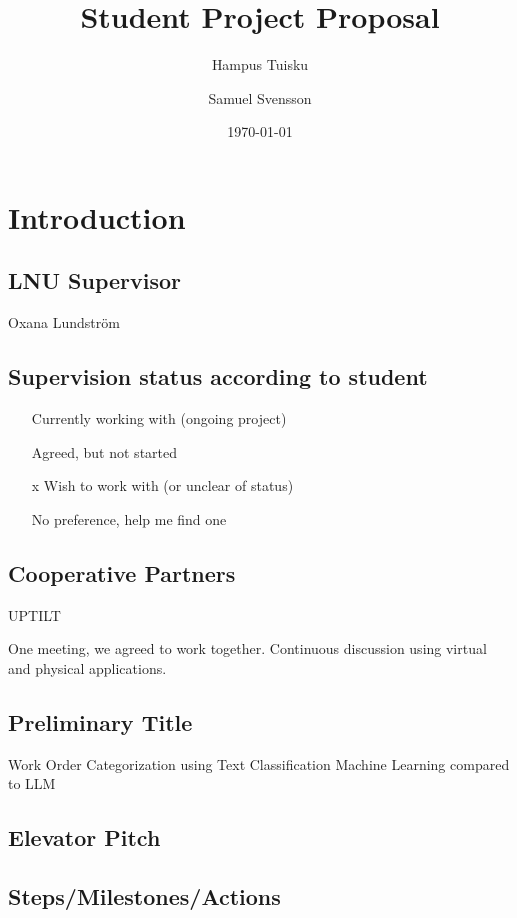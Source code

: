 \documentclass{article}
\title{Student Project Proposal}
\author{Hampus Tuisku \and Samuel Svensson}
\date{\today}
\begin{document}
\maketitle

\section{Introduction}

\subsection{LNU Supervisor}
Oxana Lundström

\subsection{Supervision status according to student}

\begin{itemize}
      \item [ ] Currently working with (ongoing project)
      \item [ ] Agreed, but not started
      \item [x] Wish to work with (or unclear of status)
      \item [ ] No preference, help me find one
\end{itemize}

\subsection{Cooperative Partners}

UPTILT

One meeting, we agreed to work together.
Continuous discussion using virtual and physical applications.

\subsection{Preliminary Title}

Work Order Categorization using Text Classification Machine Learning compared to LLM

\subsection{Elevator Pitch}



\subsection{Steps/Milestones/Actions}
\end{document}

